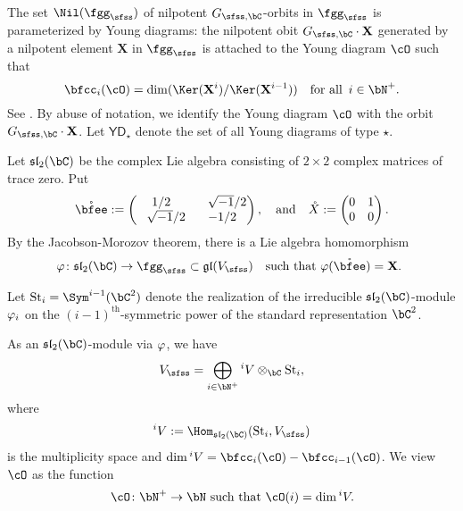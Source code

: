 \documentclass[12pt,a4paper]{amsart}
\def\YD{{\mathsf{YD}}}
\def\fsl{\mathfrak{sl}}
\newcommand{\slt}{\operatorname{SL}_2(\mathbb{R})}
\newcommand{\gl}{\mathfrak g \mathfrak l}
\newcommand{\X}{\mathbf{X}}
\numberwithin{equation}{section}
\theoremstyle{remark}
\def\slt{\fsl_2(\bC)}
\begin{document}
The set $\Nil(\fggs)$ of nilpotent $\GC$-orbits in $\fggs$ is parameterized by
Young diagrams: the nilpotent obit $\GC\cdot \X$
generated by a nilpotent element $\X$ in $\fggs$ is attached to the Young
diagram $\cO$ such that
\[
\bfcc_{i}(\cO) = \dim (\Ker(\X^{i})/\Ker(\X^{i-1})) \quad \textrm{for all  }\,
 i\in \bN^{+}.
\]
See \cite[Section~5.1]{CM}. By abuse of notation, we identify the Young
diagram $\cO$ with the orbit $\GC\cdot \X$. Let $\YD_\star$ denote the set of all Young diagrams of type $\star$.

\def\Xslt{\mathring{\bfee}}
\def\eslt{\mathring{X}}

Let $\slt$ be the complex Lie algebra consisting of $2\times 2$ complex matrices
of trace zero. Put
\[
  \Xslt := \begin{pmatrix}1/2 & \phantom{-} \sqii/2 \\
    \phantom{-} \sqii/2 & -1/2 \end{pmatrix},
  \quad \text{and} \quad
\eslt := \begin{pmatrix}0 & 1\\ 0 & 0 \end{pmatrix}.
\]
By the Jacobson-Morozov theorem,  there is a
Lie algebra homomorphism
\begin{equation}\label{eq:slt}
\SLT \colon \slt \rightarrow \fggs \subset \gl(\Vs)
\quad \text{such that $\SLT(\Xslt)=\X$. }
 \end{equation}

 Let $\St{i}=\Sym^{i-1}(\bC^{2})$ denote the realization of the irreducible
 $\slt$-module $\varphi_{i}$ on the $(i-1)^{\text{th}}$-symmetric power of the standard
 representation $\bC^{2}$.

As an $\slt$-module via $\varphi$, we have
\begin{equation}\label{eq:Vl.1}
\Vs = \bigoplus_{i\in \bN^{+}} \VV{i} \otimes_\bC \St{i},
\end{equation}
where
\[
\VV{i} := \Hom_{\slt}( \St{i},\Vs)
\]
is the multiplicity space and
$\dim \VV{i} = \bfcc_{i}(\cO) - \bfcc_{i-1}(\cO)$.
We view %
$\cO$ as the function
\[
  \cO\colon \bN^{+} \rightarrow \bN \text{ such that } \cO(i) = \dim \VV{i}.
\]

\end{document}
